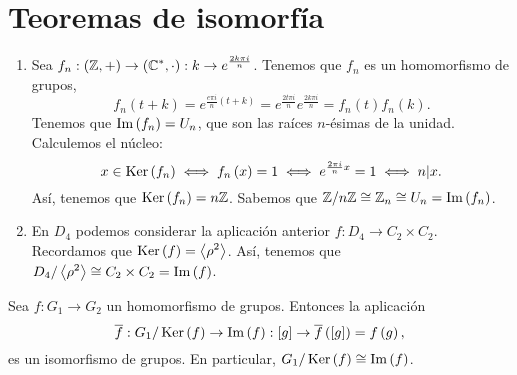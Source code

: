 \section{Teoremas de isomorfía}
\begin{eg}
\begin{enumerate}
\item Sea $\displaystyle f_{n} : \left(\mathbb{Z}, + \right) \to \left(\mathbb{C}^{*}, \cdot \right) : k \to e^{\frac{2k\pi i}{n}} $. Tenemos que $\displaystyle f_{n} $ es un homomorfismo de grupos,
	\[ f_{n}\left(t + k\right) = e^{\frac{e\pi i }{n}\left(t+k\right)} = e^{\frac{2t\pi i}{n}} e^{\frac{2k\pi i}{n}} = f_{n}\left(t\right)f_{n}\left(k\right) .\]
	Tenemos que $\displaystyle \operatorname{Im}\left(f_{n}\right) = U_{n} $, que son las raíces $\displaystyle n $-ésimas de la unidad. Calculemos el núcleo:
	\[x \in \operatorname{Ker}\left(f_{n}\right) \iff f_{n}\left(x\right) = 1 \iff e^{\frac{2\pi i}{n}x} = 1 \iff n | x .\]
Así, tenemos que $\displaystyle \operatorname{Ker}\left(f_{n}\right) = n \mathbb{Z} $. Sabemos que $\displaystyle \mathbb{Z}/n\mathbb{Z} \cong \mathbb{Z}_{n} \cong U_{n}= \operatorname{Im}\left(f_{n}\right) $. 	
\item En $\displaystyle D_{4} $ podemos considerar la aplicación anterior $\displaystyle f : D_{4} \to C_{2} \times C_{2} $. Recordamos que $\displaystyle \operatorname{Ker}\left(f\right) = \left\langle \rho^{2} \right\rangle  $. Así, tenemos que $\displaystyle D_{4}/\left\langle \rho^{2} \right\rangle  \cong C_{2} \times C_{2} = \operatorname{Im}\left(f\right)$. 
\end{enumerate}
\end{eg}
\begin{theorem}
Sea $\displaystyle f : G_{1} \to G_{2} $ un homomorfismo de grupos. Entonces la aplicación 
\[ \overline{f} : G_{1} / \operatorname{Ker}\left(f\right) \to \operatorname{Im}\left(f\right) : [g] \to \overline{f}\left([g]\right) = f\left(g\right) ,\]
es un isomorfismo de grupos. En particular, $\displaystyle G_{1}/\operatorname{Ker}\left(f\right) \cong \operatorname{Im}\left(f\right) $.
\end{theorem}
